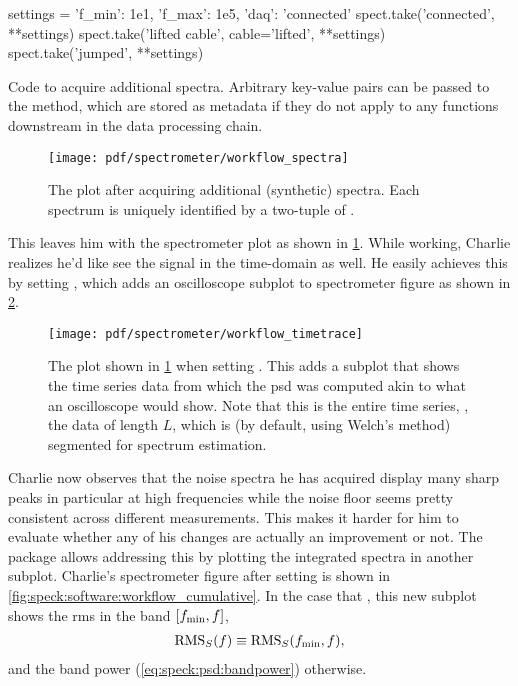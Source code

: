 \begin{listing}[htpb]
    \begin{py}
        settings = {'f_min': 1e1, 'f_max': 1e5, 'daq': 'connected'}
        spect.take('connected', **settings)
        spect.take('lifted cable', cable='lifted', **settings)
        spect.take('jumped', **settings)
    \end{py}
    \caption[]{
        Code to acquire additional spectra.
        Arbitrary key-value pairs can be passed to the  method, which are stored as metadata if they do not apply to any functions downstream in the data processing chain.
    }
    \label{lst:speck:workflow:spectra}
\end{listing}
\begin{figure}[htpb]
    \centering
    \texttt{[image: pdf/spectrometer/workflow\_spectra]}
    \caption{
        The \pyspeck plot after acquiring additional (synthetic) spectra.
        Each spectrum is uniquely identified by a two-tuple of .
    }
    \label{fig:speck:software:workflow_spectra}
\end{figure}

This leaves him with the spectrometer plot as shown in \cref{fig:speck:software:workflow_spectra}.
While working, Charlie realizes he'd like see the signal in the time-domain as well.
He easily achieves this by setting , which adds an oscilloscope subplot to spectrometer figure as shown in \cref{fig:speck:software:workflow_timetrace}.

\begin{figure}[htpb]
    \centering
    \texttt{[image: pdf/spectrometer/workflow\_timetrace]}
    \caption{
        The \pyspeck plot shown in \cref{fig:speck:software:workflow_spectra} when setting .
        This adds a subplot that shows the time series data from which the \gls{psd} was computed akin to what an oscilloscope would show.
        Note that this is the entire time series, \ie, the data of length $L$, which is (by default, using Welch's method) segmented for spectrum estimation.
    }
    \label{fig:speck:software:workflow_timetrace}
\end{figure}

Charlie now observes that the noise spectra he has acquired display many sharp peaks in particular at high frequencies while the \oneoverf noise floor seems pretty consistent across different measurements.
This makes it harder for him to evaluate whether any of his changes are actually an improvement or not.
The \pyspeck package allows addressing this by plotting the integrated spectra in another subplot.
Charlie's spectrometer figure after setting  is shown in \cref{fig:speck:software:workflow_cumulative}.
In the case that , this new subplot shows the \gls{rms} in the band $[f_{\mathrm{min}}, f]$,
\begin{align}\label{eq:speck:software:cumulative}
    \operatorname{RMS}_S(f)\equiv\operatorname{RMS}_S(f_{\mathrm{min}}, f),
\end{align}
and the band power (\cref{eq:speck:psd:bandpower}) otherwise.

